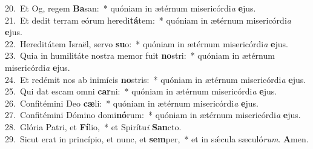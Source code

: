 {20.~}Et Og, regem \textbf{Ba}san:~* quóniam in ætérnum misericórdi\textit{a} \textbf{e}jus.\\
{21.~}Et dedit terram eórum heredi\textbf{tá}tem:~* quóniam in ætérnum misericórdi\textit{a} \textbf{e}jus.\\
{22.~}Hereditátem Israël, servo \textbf{su}o:~* quóniam in ætérnum misericórdi\textit{a} \textbf{e}jus.\\
{23.~}Quia in humilitáte nostra memor fuit \textbf{no}stri:~* quóniam in ætérnum misericórdi\textit{a} \textbf{e}jus.\\
{24.~}Et redémit nos ab inimícis \textbf{no}stris:~* quóniam in ætérnum misericórdi\textit{a} \textbf{e}jus.\\
{25.~}Qui dat escam omni \textbf{car}ni:~* quóniam in ætérnum misericórdi\textit{a} \textbf{e}jus.\\
{26.~}Confitémini Deo \textbf{cæ}li:~* quóniam in ætérnum misericórdi\textit{a} \textbf{e}jus.\\
{27.~}Confitémini Dómino domi\textbf{nó}rum:~* quóniam in ætérnum misericórdi\textit{a} \textbf{e}jus.\\
{28.~}Glória Patri, et \textbf{Fí}lio,~* et Spirítu\textit{i} \textbf{San}cto.\\
{29.~}Sicut erat in princípio, et nunc, et \textbf{sem}per,~* et in sǽcula sæculó\textit{rum}. \textbf{A}men.\\
